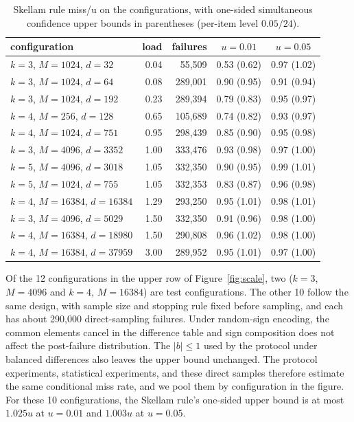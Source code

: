 \begin{table}[!htbp]
\centering
\caption{Skellam rule miss/u on the  configurations, with one-sided simultaneous confidence upper bounds in parentheses (per-item level $0.05/24$).}
\label{tab:confirm}
\begin{tabular}{lrrcc}
\toprule
configuration & load & failures & $u=0.01$ & $u=0.05$\\
\midrule
$k=3$, $M=1024$, $d=32$ & 0.04 & 55{,}509 & 0.53 (0.62) & 0.97 (1.02)\\
$k=3$, $M=1024$, $d=64$ & 0.08 & 289{,}001 & 0.90 (0.95) & 0.91 (0.94)\\
$k=3$, $M=1024$, $d=192$ & 0.23 & 289{,}394 & 0.79 (0.83) & 0.95 (0.97)\\
$k=4$, $M=256$, $d=128$ & 0.65 & 105{,}689 & 0.74 (0.82) & 0.93 (0.97)\\
$k=4$, $M=1024$, $d=751$ & 0.95 & 298{,}439 & 0.85 (0.90) & 0.95 (0.98)\\
$k=3$, $M=4096$, $d=3352$ & 1.00 & 333{,}476 & 0.93 (0.98) & 0.97 (1.00)\\
$k=5$, $M=4096$, $d=3018$ & 1.05 & 332{,}350 & 0.90 (0.95) & 0.99 (1.01)\\
$k=5$, $M=1024$, $d=755$ & 1.05 & 332{,}353 & 0.83 (0.87) & 0.96 (0.98)\\
$k=4$, $M=16384$, $d=16384$ & 1.29 & 293{,}250 & 0.95 (1.01) & 0.98 (1.01)\\
$k=3$, $M=4096$, $d=5029$ & 1.50 & 332{,}350 & 0.91 (0.96) & 0.98 (1.00)\\
$k=4$, $M=16384$, $d=18980$ & 1.50 & 290{,}808 & 0.96 (1.02) & 0.98 (1.00)\\
$k=4$, $M=16384$, $d=37959$ & 3.00 & 289{,}952 & 0.95 (1.01) & 0.97 (1.00)\\
\bottomrule
\end{tabular}
\end{table}

Of the 12 configurations in the upper row of Figure~\ref{fig:scale}, two ($k=3$, $M=4096$ and $k=4$, $M=16384$) are test configurations. The other 10 follow the same design, with sample size and stopping rule fixed before sampling, and each has about 290{,}000 direct-sampling failures. Under random-sign encoding, the common elements cancel in the difference table and sign composition does not affect the post-failure distribution. The $|b|\le1$ used by the protocol under balanced differences also leaves the upper bound unchanged. The protocol experiments, statistical experiments, and these direct samples therefore estimate the same conditional miss rate, and we pool them by configuration in the figure. For these 10 configurations, the Skellam rule's one-sided upper bound is at most $1.025u$ at $u=0.01$ and $1.003u$ at $u=0.05$.

